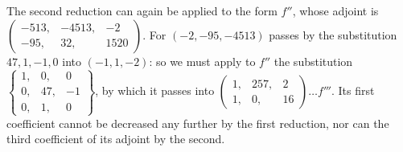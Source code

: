 The second reduction can again be applied to the form \(f''\), whose adjoint is \(\left(\begin{smallmatrix}-513,&-4513,&-2\\-95,&32,&1520\end{smallmatrix}\right)\). For \((-2,-95,-4513)\) passes by the substitution \(47,1,-1,0\) into \((-1,1,-2)\): so we must apply to \(f''\) the substitution \(\left\{\begin{smallmatrix}1,&0,&0\\0,&47,&-1\\0,&1,&0\end{smallmatrix}\right\}\), by which it passes into \(\left(\begin{smallmatrix}1,&257,&2\\1,&0,&16\end{smallmatrix}\right)\ldots f'''\). Its first coefficient cannot be decreased any further by the first reduction, nor can the third coefficient of its adjoint by the second.

